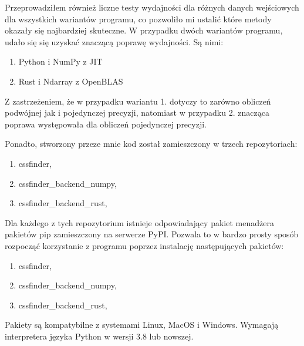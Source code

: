 \documentclass[11pt, a4paper]{article}
\begin{document}
\begin{sloppypar}
    Przeprowadziłem również liczne testy wydajności dla różnych danych wejściowych dla
    wszystkich wariantów programu, co pozwoliło mi ustalić które metody okazały się najbardziej
    skuteczne. W przypadku dwóch wariantów programu, udało się się uzyskać znaczącą poprawę
    wydajności. Są nimi:
    \begin{enumerate}
      \item Python i NumPy z JIT

      \item Rust i Ndarray z OpenBLAS
    \end{enumerate}
    Z zastrzeżeniem, że w przypadku wariantu 1. dotyczy to zarówno obliczeń podwójnej
    jak i pojedynczej precyzji, natomiast w przypadku 2. znacząca poprawa występowała dla
    obliczeń pojedynczej precyzji.

    Ponadto, stworzony przeze mnie kod został zamieszczony w trzech repozytoriach:
    \begin{enumerate}
      \item cssfinder\cite{CSSFinder_New},

      \item cssfinder\_backend\_numpy\cite{CSSFinder_New_Numpy},

      \item cssfinder\_backend\_rust\cite{CSSFinder_New_Rust},
    \end{enumerate}

    Dla każdego z tych repozytorium istnieje odpowiadający pakiet menadżera pakietów pip
    zamieszczony na serwerze PyPI. Pozwala to w bardzo prosty sposób rozpocząć korzystanie
    z programu poprzez instalację następujących pakietów:
    \begin{enumerate}
      \item cssfinder\cite{CSSFinder_New_PyPI},

      \item cssfinder\_backend\_numpy\cite{CSSFinder_New_Numpy_PyPI},

      \item cssfinder\_backend\_rust\cite{CSSFinder_New_Rust_PyPI},
    \end{enumerate}

    Pakiety są kompatybilne z systemami Linux, MacOS i Windows. Wymagają interpretera języka
    Python w wersji 3.8 lub nowszej.
  \end{sloppypar}
  \newpage
  \begin{sloppypar}
    \medskip


    \printbibliography
    [heading=bibintoc, title={Odwołania}]
  \end{sloppypar}
\end{document}
